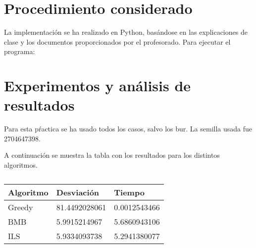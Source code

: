 \documentclass[twoside]{article}
\begin{document}
\section{Procedimiento considerado}

La implementación se ha realizado en Python, basándose en las explicaciones
de clase y los documentos proporcionados por el profesorado. Para ejecutar el programa:


\section{Experimentos y análisis de resultados}

Para esta pŕactica se ha usado todos los casos, salvo los bur. La semilla
usada fue 2704647398.

A continuación se muestra la tabla con los resultados para los distintos algoritmos.

\begin{table}[h]
\centering
    \begin{tabular}{lll}
    \toprule
    Algoritmo               & Desviación & Tiempo \\
    \midrule
    Greedy&81.4492028061&0.0012543466\\
    BMB&5.9915214967&5.6860943106\\
    ILS&5.9334093738&5.2941380077\\
    \bottomrule
    \end{tabular}
    \caption{}
\end{table}
\end{document}
